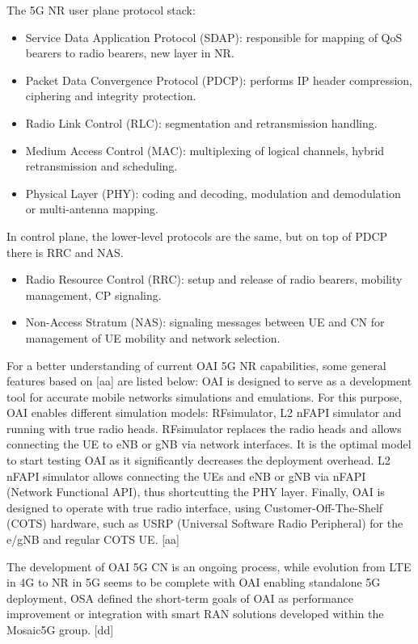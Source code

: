 \documentclass[12pt,a4paper,twoside]{report}
\begin{document}
The 5G NR user plane protocol stack:
\begin{itemize}
	\item Service Data Application Protocol (SDAP): responsible for mapping of QoS bearers to radio bearers, new layer in NR.
	\item Packet Data Convergence Protocol (PDCP): performs IP header compression, ciphering and integrity protection.
	\item Radio Link Control (RLC): segmentation and retransmission handling.
	\item Medium Access Control (MAC): multiplexing of logical channels, hybrid retransmission and scheduling.
	\item Physical Layer (PHY): coding and decoding, modulation and demodulation or multi-antenna mapping.
\end{itemize}
In control plane, the lower-level protocols are the same, but on top of PDCP there is RRC and NAS.
\begin{itemize}
	\item Radio Resource Control (RRC): setup and release of radio bearers, mobility management, CP signaling.
	\item Non-Access Stratum (NAS): signaling messages between UE and CN for management of UE mobility and network selection.
\end{itemize}
For a better understanding of current OAI 5G NR capabilities, some general features based on [aa] are listed below:
OAI is designed to serve as a development tool for accurate mobile networks simulations and emulations. For this purpose, OAI enables different simulation models: RFsimulator, L2 nFAPI simulator and running with true radio heads. RFsimulator replaces the radio heads and allows connecting the UE to eNB or gNB via network interfaces. It is the optimal model to start testing OAI as it significantly decreases the deployment overhead. L2 nFAPI simulator allows connecting the UEs and eNB or gNB via nFAPI (Network Functional API), thus shortcutting the PHY layer. Finally, OAI is designed to operate with true radio interface, using Customer-Off-The-Shelf (COTS) hardware, such as USRP (Universal Software Radio Peripheral) for the e/gNB and regular COTS UE. [aa] 

The development of OAI 5G CN is an ongoing process, while evolution from LTE in 4G to NR in 5G seems to be complete with OAI enabling standalone 5G deployment, OSA defined the short-term goals of OAI as performance improvement or integration with smart RAN solutions developed within the Mosaic5G group. [dd]
\end{document}
